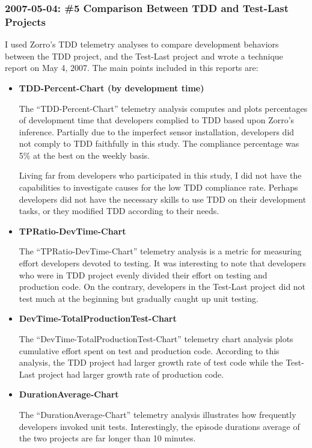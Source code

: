 \subsubsection{2007-05-04: \#5 Comparison Between TDD and Test-Last Projects}
I used Zorro's TDD telemetry analyses to compare development behaviors between the TDD project, and the Test-Last project and wrote a technique report on May 4, 2007. The main points included in this reports are:

\begin{itemize}
\item {\textbf{TDD-Percent-Chart (by development time)}}

The ``TDD-Percent-Chart'' telemetry analysis computes and plots percentages of development time that developers complied to TDD based upon Zorro's inference. Partially due to the imperfect sensor installation, developers did not comply to TDD faithfully in this study. The compliance percentage was 5\% at the best on the weekly basis.

Living far from developers who participated in this study, I did not have the capabilities to investigate causes for the low TDD compliance rate. Perhaps developers did not have the necessary skills to use TDD on their development tasks, or they modified TDD according to their needs. 

\item {\textbf{TPRatio-DevTime-Chart}}

The ``TPRatio-DevTime-Chart'' telemetry analysis is a metric for measuring effort developers devoted to testing. It was interesting to note that developers who were in TDD project evenly divided their effort on testing and production code. On the contrary, developers in the Test-Last project did not test much at the beginning but gradually caught up unit testing. 

\item {\textbf{DevTime-TotalProductionTest-Chart}}

The ``DevTime-TotalProductionTest-Chart'' telemetry chart analysis plots cumulative effort spent on test and production code. According to this analysis, the TDD project had larger growth rate of test code while the Test-Last project had larger growth rate of production code. 

\item {\textbf{DurationAverage-Chart}}

The ``DurationAverage-Chart'' telemetry analysis illustrates how frequently developers invoked unit tests. Interestingly, the episode durations average of the two projects are far longer than 10 minutes.  

\end{itemize}


